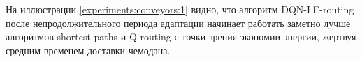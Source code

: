 \documentclass[specification,annotation,times]{itmo-student-thesis}
\theoremstyle{definition}
\begin{document}
На иллюстрации \ref{experiments:conveyors:1} видно, что алгоритм DQN-LE-routing
после непродолжительного периода адаптации начинает работать
заметно лучше алгоритмов shortest paths и Q-routing с точки зрения экономии энергии,
жертвуя средним временем доставки чемодана. 






\end{document}
